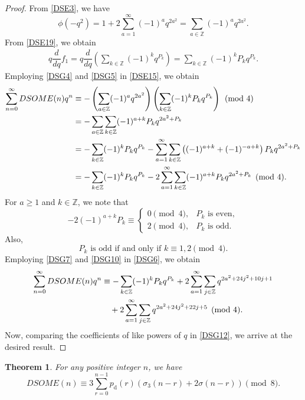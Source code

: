 \documentclass[12pt]{article}
\numberwithin{equation}{section}
\newtheorem{theorem}{Theorem}[section]
\theoremstyle{definition}
\theoremstyle{remark}
\numberwithin{equation}{section}
\begin{document}
\begin{proof}
From \eqref{DSE3}, we have
\begin{equation}\label{DSG4}
\phi(-q^2)
=
1+2\sum_{a=1}^{\infty}(-1)^a q^{2a^2}
=
\sum_{a\in\mathbb Z}(-1)^a q^{2a^2}.
\end{equation}
From \eqref{DSE19}, we obtain
\begin{align}
q\dfrac{d}{dq}f_1
=
q\dfrac{d}{dq}
\left(
\sum_{k\in\mathbb Z}(-1)^kq^{P_k}
\right)
=
\sum_{k\in\mathbb Z}
(-1)^kP_kq^{P_k}.
\label{DSG5}
\end{align}
Employing  \eqref{DSG4} and \eqref{DSG5} in \eqref{DSE15}, we obtain
\begin{align}
\sum_{n=0}^{\infty}DSOME(n)q^n
&\equiv
-\left(
\sum_{a\in\mathbb Z}(-1)^a q^{2a^2}
\right)
\left(
\sum_{k\in\mathbb Z}(-1)^kP_kq^{P_k}
\right)
\pmod 4
\notag\\
&=
-\sum_{a\in\mathbb Z}
\sum_{k\in\mathbb Z}
(-1)^{a+k}P_kq^{2a^2+P_k}
\notag\\
&=
-\sum_{k\in\mathbb Z}
(-1)^kP_kq^{P_k}-
\sum_{a=1}^{\infty}
\sum_{k\in\mathbb Z}
\left(
(-1)^{a+k}+(-1)^{-a+k}
\right)
P_kq^{2a^2+P_k}
\notag\\
&\label{DSG6}=
-\sum_{k\in\mathbb Z}
(-1)^kP_kq^{P_k}-
2\sum_{a=1}^{\infty}
\sum_{k\in\mathbb Z}
(-1)^{a+k}P_kq^{2a^2+P_k}
\pmod 4.
\end{align}
For $a\geq1$ and $k\in\mathbb Z$, we note that
\begin{equation}\label{DSG7}
-2(-1)^{a+k}P_k
\equiv
\begin{cases}
0\pmod 4,
& P_k\text{ is even},\\
2\pmod 4,
& P_k\text{ is odd}.
\end{cases}
\end{equation}
Also, 
\begin{equation}\label{DSG10}
P_k\text{ is odd}
\text{ if and only if }
k\equiv1,2\pmod 4.
\end{equation}
Employing \eqref{DSG7} and \eqref{DSG10} in \eqref{DSG6}, we obtain
\begin{align}
\sum_{n=0}^{\infty}DSOME(n)q^n
&\equiv
-\sum_{k\in\mathbb Z}
(-1)^kP_kq^{P_k}
+
2\sum_{a=1}^{\infty}
\sum_{j\in\mathbb Z}
q^{2a^2+24j^2+10j+1}
\notag\\
&\label{DSG12}\quad+
2\sum_{a=1}^{\infty}
\sum_{j\in\mathbb Z}
q^{2a^2+24j^2+22j+5}
\pmod 4.
\end{align}
Now, comparing the coefficients of like powers of $q$ in \eqref{DSG12}, we arrive at the  desired result. 
\end{proof}
\begin{theorem}\label{DSM8THM}
 For any positive integer $n$, we have
\begin{equation*}
DSOME(n)
\equiv
3\sum_{r=0}^{n-1}
p_{\mathrm d}(r)
\left(
\sigma_3(n-r)+2\sigma(n-r)
\right)
\pmod 8.
\end{equation*}
\end{theorem}
\end{document}
